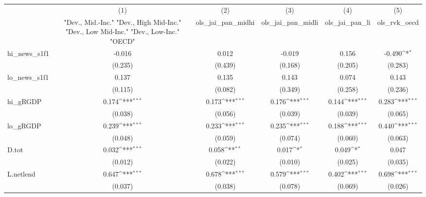 {
\def\sym#1{\ifmmode^{#1}\else\(^{#1}\)\fi}
\begin{tabular}{l*{5}{c}}
\toprule
            &\multicolumn{1}{c}{(1)}&\multicolumn{1}{c}{(2)}&\multicolumn{1}{c}{(3)}&\multicolumn{1}{c}{(4)}&\multicolumn{1}{c}{(5)}\\
            &\multicolumn{1}{c}{ "Dev., Mid.-Inc." "Dev., High Mid-Inc." "Dev., Low Mid-Inc." "Dev., Low-Inc." "OECD" }&\multicolumn{1}{c}{ols\_jai\_pan\_midhi}&\multicolumn{1}{c}{ols\_jai\_pan\_midli}&\multicolumn{1}{c}{ols\_jai\_pan\_li}&\multicolumn{1}{c}{ols\_rvk\_oecd}\\
\midrule
hi\_news\_s1f1&      -0.016         &       0.012         &      -0.019         &       0.156         &      -0.490\sym{*}  \\
            &     (0.235)         &     (0.439)         &     (0.168)         &     (0.205)         &     (0.283)         \\
\addlinespace
lo\_news\_s1f1&       0.137         &       0.135         &       0.143         &       0.074         &       0.143         \\
            &     (0.115)         &     (0.082)         &     (0.349)         &     (0.258)         &     (0.236)         \\
\addlinespace
hi\_gRGDP    &       0.174\sym{***}&       0.173\sym{***}&       0.176\sym{***}&       0.144\sym{***}&       0.283\sym{***}\\
            &     (0.038)         &     (0.056)         &     (0.039)         &     (0.039)         &     (0.065)         \\
\addlinespace
lo\_gRGDP    &       0.239\sym{***}&       0.233\sym{***}&       0.235\sym{***}&       0.188\sym{***}&       0.440\sym{***}\\
            &     (0.048)         &     (0.059)         &     (0.074)         &     (0.060)         &     (0.063)         \\
\addlinespace
D.tot       &       0.032\sym{***}&       0.058\sym{**} &       0.017\sym{*}  &       0.049\sym{*}  &       0.047         \\
            &     (0.012)         &     (0.022)         &     (0.010)         &     (0.025)         &     (0.035)         \\
\addlinespace
L.netlend   &       0.647\sym{***}&       0.678\sym{***}&       0.579\sym{***}&       0.402\sym{***}&       0.698\sym{***}\\
            &     (0.037)         &     (0.038)         &     (0.078)         &     (0.069)         &     (0.026)         \\

\end{tabular}}
